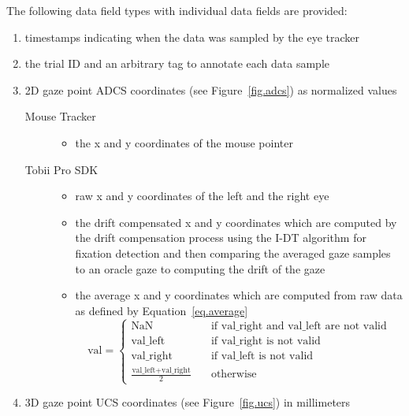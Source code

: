 \documentclass[a4paper,oneside]{book}
\begin{document}
The following data field types with individual data fields are provided:
\begin{enumerate}
    \item timestamps indicating when the data was sampled by the eye tracker
    \item the trial ID and an arbitrary tag to annotate each data sample
    \item 2D gaze point ADCS coordinates (see Figure~\ref{fig.adcs}) as normalized values
        \begin{description}
            \item[Mouse Tracker] \hfill
                \begin{itemize}
                    \item the x and y coordinates of the mouse pointer
                \end{itemize}
            \item[Tobii Pro SDK] \hfill
                \begin{itemize}
                    \item raw x and y coordinates of the left and the right eye
                    \item the drift compensated x and y coordinates which are computed by the drift compensation process using the I-DT algorithm for fixation detection and then comparing the averaged gaze samples to an oracle gaze to computing the drift of the gaze
                    \item the average x and y coordinates which are computed from raw data as defined by Equation~\ref{eq.average}
\begin{equation}
    \label{eq.average}
    \text{val} =
        \begin{cases}
            \text{NaN}                                      & \quad \text{if val\_right and val\_left are not valid}\\
            \text{val\_left}                                & \quad \text{if val\_right is not valid}\\
            \text{val\_right}                               & \quad \text{if val\_left is not valid}\\
            \frac{\text{val\_left} + \text{val\_right}}{2}  & \quad \text{otherwise}
        \end{cases}
\end{equation}
                \end{itemize}
        \end{description}
    \item 3D gaze point UCS coordinates (see Figure~\ref{fig.ucs}) in millimeters

\end{enumerate}
\end{document}
